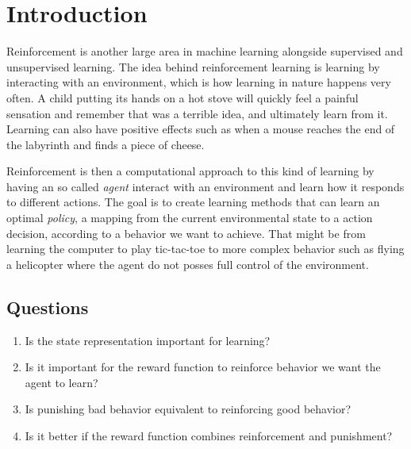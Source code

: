 \documentclass[report.tex]{subfiles}
\begin{document}
    \section*{\centering Introduction}

    Reinforcement is another large area in machine learning alongside supervised and unsupervised learning. The idea behind reinforcement learning is learning by interacting with an environment, which is how learning in nature happens very often. A child putting its hands on a hot stove will quickly feel a painful sensation and remember that was a terrible idea, and ultimately learn from it. Learning can also have positive effects such as when a mouse reaches the end of the labyrinth and finds a piece of cheese.

    Reinforcement is then a computational approach to this kind of learning by having an so called \textit{agent} interact with an environment and learn how it responds to different actions. The goal is to create learning methods that can learn an optimal \textit{policy}, a mapping from the current environmental state to a action decision, according to a behavior we want to achieve. That might be from learning the computer to play tic-tac-toe to more complex behavior such as flying a helicopter where the agent do not posses full control of the environment.



    \subsection*{Questions}

    \begin{enumerate}
        \item Is the state representation important for learning?
        \item Is it important for the reward function to reinforce behavior we want the agent to learn?
        \item Is punishing bad behavior equivalent to reinforcing good behavior?
        \item Is it better if the reward function combines reinforcement and punishment?
    \end{enumerate}
\end{document}
